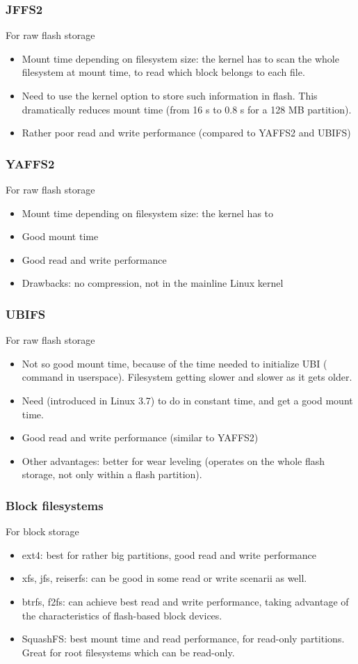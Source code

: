 \begin{frame}
\frametitle{JFFS2}
For raw flash storage
\begin{itemize}
\item Mount time depending on filesystem size: the kernel has to
      scan the whole filesystem at mount time, to read which block
      belongs to each file.
\item Need to use the  kernel option
      to store such information in flash. This dramatically reduces
      mount time (from 16 s to 0.8 s for a 128 MB partition).
\item Rather poor read and write performance (compared to YAFFS2 and
      UBIFS)
\end{itemize}
\end{frame}

\begin{frame}
\frametitle{YAFFS2}
For raw flash storage
\begin{itemize}
\item Mount time depending on filesystem size: the kernel has to
\item Good mount time
\item Good read and write performance
\item Drawbacks: no compression, not in the mainline Linux kernel
\end{itemize}
\end{frame}

\begin{frame}
\frametitle{UBIFS}
For raw flash storage
\begin{itemize}
\item Not so good mount time, because of the time needed
      to initialize UBI ( command in userspace).
      Filesystem getting slower and slower as it gets older.
\item Need  (introduced in Linux 3.7) to do
       in constant time, and get a good mount time. 
\item Good read and write performance (similar to YAFFS2)
\item Other advantages: better for wear leveling (operates on the whole
      flash storage, not only within a flash partition).
\end{itemize}
\end{frame}

\begin{frame}
\frametitle{Block filesystems}
For block storage
\begin{itemize}
\item ext4: best for rather big partitions, good read and write
      performance
\item xfs, jfs, reiserfs: can be good in some read or write scenarii
      as well.
\item btrfs, f2fs: can achieve best read and write performance,
      taking advantage of the characteristics of flash-based block
      devices.
\item SquashFS: best mount time and read performance, for read-only
      partitions. Great for root filesystems which can be read-only.
\end{itemize}
\end{frame}

